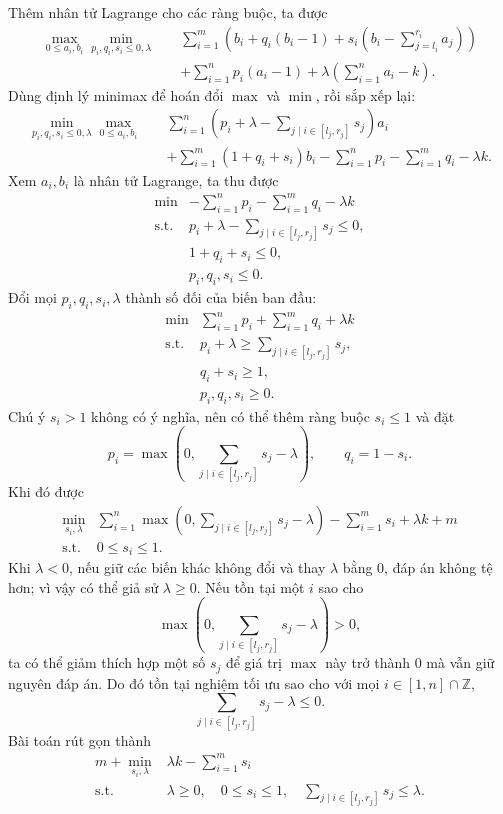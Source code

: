 \documentclass[11pt]{article}
\begin{document}
Thêm nhân tử Lagrange cho các ràng buộc, ta được
\[
\begin{aligned}
\max_{0\le a_i,b_i}\min_{p_i,q_i,s_i\le 0,\lambda}\quad
&\sum_{i=1}^{m}\left(
  b_i+q_i(b_i-1)+s_i\left(b_i-\sum_{j=l_i}^{r_i}a_j\right)
 \right)\\
&+\sum_{i=1}^{n}p_i(a_i-1)+\lambda\left(\sum_{i=1}^{n}a_i-k\right).
\end{aligned}
\]
Dùng định lý minimax để hoán đổi \(\max\) và \(\min\), rồi sắp xếp lại:
\[
\begin{aligned}
\min_{p_i,q_i,s_i\le 0,\lambda}\max_{0\le a_i,b_i}\quad
&\sum_{i=1}^{n}\left(p_i+\lambda-\sum_{j\mid i\in[l_j,r_j]}s_j\right)a_i\\
&+\sum_{i=1}^{m}(1+q_i+s_i)b_i-\sum_{i=1}^{n}p_i-\sum_{i=1}^{m}q_i-\lambda k.
\end{aligned}
\]
Xem \(a_i,b_i\) là nhân tử Lagrange, ta thu được
\[
\begin{array}{ll}
  \min & \displaystyle-\sum_{i=1}^{n}p_i-\sum_{i=1}^{m}q_i-\lambda k\\
  \text{s.t.} &
  p_i+\lambda-\displaystyle\sum_{j\mid i\in[l_j,r_j]}s_j\le 0,\\
  & 1+q_i+s_i\le 0,\\
  & p_i,q_i,s_i\le 0.
\end{array}
\]
Đổi mọi \(p_i,q_i,s_i,\lambda\) thành số đối của biến ban đầu:
\[
\begin{array}{ll}
  \min & \displaystyle\sum_{i=1}^{n}p_i+\sum_{i=1}^{m}q_i+\lambda k\\
  \text{s.t.} &
  p_i+\lambda\ge \displaystyle\sum_{j\mid i\in[l_j,r_j]}s_j,\\
  & q_i+s_i\ge 1,\\
  & p_i,q_i,s_i\ge 0.
\end{array}
\]
Chú ý \(s_i>1\) không có ý nghĩa, nên có thể thêm ràng buộc \(s_i\le 1\) và đặt
\[
  p_i=\max\left(0,\sum_{j\mid i\in[l_j,r_j]}s_j-\lambda\right),
  \qquad q_i=1-s_i.
\]
Khi đó được
\[
\begin{array}{ll}
  \displaystyle\min_{s_i,\lambda} &
  \displaystyle
  \sum_{i=1}^{n}\max\left(0,\sum_{j\mid i\in[l_j,r_j]}s_j-\lambda\right)
  -\sum_{i=1}^{m}s_i+\lambda k+m\\
  \text{s.t.} & 0\le s_i\le 1.
\end{array}
\]
Khi \(\lambda<0\), nếu giữ các biến khác không đổi và thay \(\lambda\) bằng
\(0\), đáp án không tệ hơn; vì vậy có thể giả sử \(\lambda\ge 0\). Nếu tồn tại
một \(i\) sao cho
\[
  \max\left(0,\sum_{j\mid i\in[l_j,r_j]}s_j-\lambda\right)>0,
\]
ta có thể giảm thích hợp một số \(s_j\) để giá trị \(\max\) này trở thành \(0\)
mà vẫn giữ nguyên đáp án. Do đó tồn tại nghiệm tối ưu sao cho với mọi
\(i\in[1,n]\cap\mathbb Z\),
\[
  \sum_{j\mid i\in[l_j,r_j]}s_j-\lambda\le 0.
\]
Bài toán rút gọn thành
\[
\begin{array}{ll}
  \displaystyle m+\min_{s_i,\lambda} & \displaystyle \lambda k-\sum_{i=1}^{m}s_i\\
  \text{s.t.} & \lambda\ge 0,\quad 0\le s_i\le 1,\quad
  \displaystyle\sum_{j\mid i\in[l_j,r_j]}s_j\le \lambda.
\end{array}
\]
\end{document}
